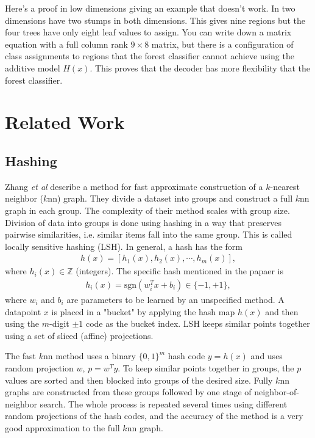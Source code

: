 \documentclass{article}
\begin{document}
Here's a proof in low dimensions giving an example that doesn't work.  In two dimensions have two stumps in both dimensions.  This gives nine regions but the four trees have only eight leaf values to assign.  You can write down a matrix equation with a full column rank $9 \times 8$ matrix, but there is a configuration of class assignments to regions that the forest classifier cannot achieve using the additive model $H(x)$.  This proves that the decoder has more flexibility that the forest classifier.

\section{Related Work}

\subsection{Hashing}

Zhang {\em et al} \cite{fast_knn} describe a method for fast approximate construction of a $k$-nearest neighbor ($k$nn) graph.  They divide a dataset into groups and construct a full $k$nn graph in each group.  The complexity of their method scales with group size.  Division of data into groups is done using hashing in a way that preserves pairwise similarities, i.e. similar items fall into the same group.  This is called locally sensitive hashing (LSH).  In general, a hash has the form
\begin{gather*}
h(x) = [ h_1(x), h_2(x), \cdots, h_m(x) ],
\end{gather*}
where $h_i(x) \in \mathbb{Z}$ (integers).  The specific hash mentioned in the papaer is
\begin{gather*}
h_i(x) = \text{sgn}(w_i^T x + b_i) \in \{-1, +1\},
\end{gather*}
where $w_i$ and $b_i$ are parameters to be learned by an unspecified method.  A datapoint $x$ is placed in a "bucket" by applying the hash map $h(x)$ and then using the $m$-digit $\pm 1$ code as the bucket index.  LSH keeps similar points together using a set of sliced (affine) projections.

The fast $k$nn method uses a binary $\{0,1\}^m$ hash code $y = h(x)$ and uses random projection $w$, $p = w^T y$.  To keep similar points together in groups, the $p$ values are sorted and then blocked into groups of the desired size.  Fully $k$nn graphs are constructed from these groups followed by one stage of neighbor-of-neighbor search.  The whole process is repeated several times using different random projections of the hash codes, and the accuracy of the method is a very good approximation to the full $k$nn graph.
\end{document}
